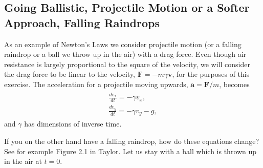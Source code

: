 \documentclass[letterpaper,10pt,english]{sphinxmanual}
\begin{document}
\subsection{Going Ballistic, Projectile Motion or a Softer Approach, Falling Raindrops}
\label{\detokenize{chapter2:going-ballistic-projectile-motion-or-a-softer-approach-falling-raindrops}}
As an example of Newton’s Laws we consider projectile motion (or a
falling raindrop or a ball we throw up in the air) with a drag force. Even though air resistance is
largely proportional to the square of the velocity, we will consider
the drag force to be linear to the velocity, \(\boldsymbol{F}=-m\gamma\boldsymbol{v}\),
for the purposes of this exercise. The acceleration for a projectile moving upwards,
\(\boldsymbol{a}=\boldsymbol{F}/m\), becomes
\begin{equation*}
\begin{split}
\begin{eqnarray}
\frac{dv_x}{dt}=-\gamma v_x,\\
\nonumber
\frac{dv_y}{dt}=-\gamma v_y-g,
\end{eqnarray}
\end{split}
\end{equation*}
and \(\gamma\) has dimensions of inverse time.

If you on the other hand have a falling raindrop, how do these equations change? See for example Figure 2.1 in Taylor.
Let us stay with a ball which is thrown up in the air at \(t=0\).
\end{document}
